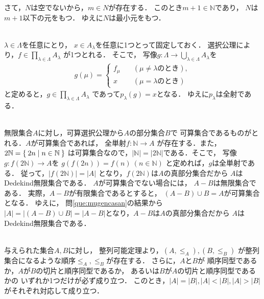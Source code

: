 \begin{description}
  さて，$N$は空でないから，$m \in N$が存在する．
  このとき$m+1 \in \mathbb{N}$であり，
  $N$は$m+1$以下の元をもつ．
  ゆえに$N$は最小元をもつ．


\item[\refque{que:prozensya}] \mbox{} \\
  $\lambda \in \varLambda$を任意にとり，
  $x \in A_{\lambda}$を任意に1つとって固定しておく．
  選択公理により，$f \in \prod_{\lambda \in \varLambda} A_{\lambda}$
  が1つとれる．
  そこで，
  写像$g: \varLambda \longrightarrow \bigcup_{\lambda \in \varLambda} A_{\lambda}$を
  \begin{align*}
    g ({\mu} )= \left \{
      \begin{aligned}
         f_{\mu} \quad & ( \mu \neq \lambda \text{のとき} ) , \\
        x \quad \, & (\mu = \lambda \text{のとき}) 
      \end{aligned}
      \right.
  \end{align*}
  と定めると，$g \in \prod_{\lambda \in \varLambda} A_{\lambda}$
  であって$p_{\lambda} (g) = x$となる．
  ゆえに$p_{\lambda}$は全射である．

\item[\refque{que:dedeinf}] \mbox{} \\
  無限集合$A$に対し，可算選択公理から$A$の部分集合$B$で
  可算集合であるものがとれる．$A$が可算集合であれば，
  全単射$f : \mathbb{N} \longrightarrow A$
  が存在する．また，$2 \mathbb{N} 
  = \Set{ 2n \mid n \in \mathbb{N} }$
  は可算集合なので，$\lvert \mathbb{N} \rvert 
  = \lvert 2 \mathbb{N} \rvert$である．そこで，
  写像$g: f(2 \mathbb{N}) \longrightarrow A$を
  $g(f(2n)) = f(n) \ (n \in \mathbb{N})$
  と定めれば，$g$は全単射である．
  従って，$\lvert f(2 \mathbb{N} ) \rvert = \lvert A \rvert$
  となり，$f(2 \mathbb{N})$は$A$の真部分集合だから
  $A$はDedekind無限集合である．
  $A$が可算集合でない場合には，
  $A-B$は無限集合である．
  実際，$A-B$が有限集合であるとすると，
  $(A- B) \cup B = A$が可算集合となる．
  ゆえに，
  問\ref{que:mugencasan}の結果から
  $\lvert A \rvert = \lvert (A-B)  \cup B \rvert 
  = \rvert A-B \rvert$となり，$A-B$は$A$の真部分集合だから
  $A$はDedekind無限集合である．

  

\item[\refque{que:chap4_hikaku}] \mbox{} \\
  与えられた集合$A,B$に対し，
  整列可能定理より，$(A, {\leq_A}), (B, {\leq_B})$
  が整列集合になるような順序$\leq_A, \leq_B$が存在する．
  さらに，$A$と$B$が
  順序同型であるか，$A$が$B$の切片と順序同型であるか，
  あるいは$B$が$A$の切片と順序同型であるかの
  いずれか1つだけが必ず成り立つ．
  このとき，$\lvert A \rvert =
  \lvert B \rvert , \lvert A \rvert < \lvert B \rvert , 
  \lvert A \rvert > \lvert B \rvert$
  がそれぞれ対応して成り立つ．


\end{description}
